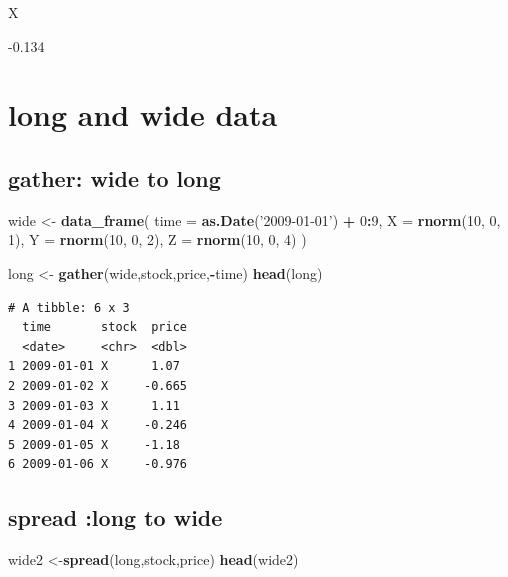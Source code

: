 \documentclass[]{book}
\newenvironment{Shaded}{\begin{snugshade}}{\end{snugshade}}
\newcommand{\DataTypeTok}[1]{\textcolor[rgb]{0.13,0.29,0.53}{#1}}
\newcommand{\DecValTok}[1]{\textcolor[rgb]{0.00,0.00,0.81}{#1}}
\newcommand{\KeywordTok}[1]{\textcolor[rgb]{0.13,0.29,0.53}{\textbf{#1}}}
\newcommand{\NormalTok}[1]{#1}
\newcommand{\OperatorTok}[1]{\textcolor[rgb]{0.81,0.36,0.00}{\textbf{#1}}}
\newcommand{\StringTok}[1]{\textcolor[rgb]{0.31,0.60,0.02}{#1}}
\theoremstyle{definition}
\theoremstyle{definition}
\theoremstyle{definition}
\theoremstyle{remark}
\begin{document}
X

-0.134

\hypertarget{long-and-wide-data}{%
\section{long and wide data}\label{long-and-wide-data}}

\hypertarget{gather-wide-to-long}{%
\subsection{gather: wide to long}\label{gather-wide-to-long}}

\begin{Shaded}
\begin{Highlighting}[]
\NormalTok{wide <-}\StringTok{ }\KeywordTok{data_frame}\NormalTok{(}
  \DataTypeTok{time =} \KeywordTok{as.Date}\NormalTok{(}\StringTok{'2009-01-01'}\NormalTok{) }\OperatorTok{+}\StringTok{ }\DecValTok{0}\OperatorTok{:}\DecValTok{9}\NormalTok{,}
  \DataTypeTok{X =} \KeywordTok{rnorm}\NormalTok{(}\DecValTok{10}\NormalTok{, }\DecValTok{0}\NormalTok{, }\DecValTok{1}\NormalTok{),}
  \DataTypeTok{Y =} \KeywordTok{rnorm}\NormalTok{(}\DecValTok{10}\NormalTok{, }\DecValTok{0}\NormalTok{, }\DecValTok{2}\NormalTok{),}
  \DataTypeTok{Z =} \KeywordTok{rnorm}\NormalTok{(}\DecValTok{10}\NormalTok{, }\DecValTok{0}\NormalTok{, }\DecValTok{4}\NormalTok{)}
\NormalTok{)}

\NormalTok{long <-}\StringTok{ }\KeywordTok{gather}\NormalTok{(wide,stock,price,}\OperatorTok{-}\NormalTok{time)}
\KeywordTok{head}\NormalTok{(long)}
\end{Highlighting}
\end{Shaded}

\begin{verbatim}
# A tibble: 6 x 3
  time       stock  price
  <date>     <chr>  <dbl>
1 2009-01-01 X      1.07 
2 2009-01-02 X     -0.665
3 2009-01-03 X      1.11 
4 2009-01-04 X     -0.246
5 2009-01-05 X     -1.18 
6 2009-01-06 X     -0.976
\end{verbatim}

\hypertarget{spread-long-to-wide}{%
\subsection{spread :long to wide}\label{spread-long-to-wide}}

\begin{Shaded}
\begin{Highlighting}[]
\NormalTok{wide2 <-}\KeywordTok{spread}\NormalTok{(long,stock,price)}
\KeywordTok{head}\NormalTok{(wide2)}
\end{Highlighting}
\end{Shaded}
\end{document}
